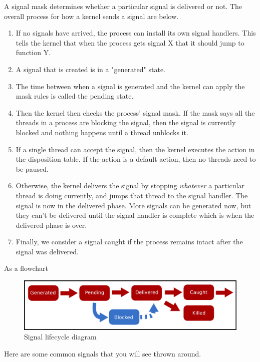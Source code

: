 A signal mask determines whether a particular signal is delivered or not.
The overall process for how a kernel sends a signal are below.

\begin{enumerate}
\item If no signals have arrived, the process can install its own signal handlers.
  This tells the kernel that when the process gets signal X that it should jump to function Y.
\item A signal that is created is in a "generated" state.
\item The time between when a signal is generated and the kernel can apply the mask rules is called the pending state.
\item Then the kernel then checks the process' signal mask.
  If the mask says all the threads in a process are blocking the signal, then the signal is currently blocked and nothing happens until a thread unblocks it.
\item If a single thread can accept the signal, then the kernel executes the action in the disposition table.
  If the action is a default action, then no threads need to be paused.
\item Otherwise, the kernel delivers the signal by stopping \textit{whatever} a particular thread is doing currently, and jumps that thread to the signal handler.
  The signal is now in the delivered phase.
  More signals can be generated now, but they can't be delivered until the signal handler is complete which is when the delivered phase is over.
\item Finally, we consider a signal caught if the process remains intact after the signal was delivered.
\end{enumerate}

As a flowchart

\begin{figure}[H]
\centering
\includegraphics[width=.8\textwidth]{signals/drawings/signal_lifecycle.eps}
\caption{Signal lifecycle diagram}
\end{figure}

Here are some common signals that you will see thrown around.

